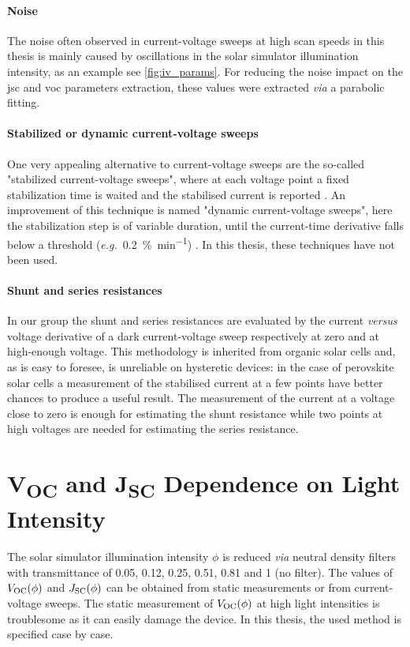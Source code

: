 	\paragraph{Noise} The noise often observed in current-voltage sweeps at high scan speeds in this thesis is mainly caused by oscillations in the solar simulator illumination intensity, as an example see \cref{fig:iv_params}.
	For reducing the noise impact on the \gls{jsc} and \gls{voc} parameters extraction, these values were extracted \textit{via} a parabolic fitting.

	\paragraph{Stabilized or dynamic current-voltage sweeps} One very appealing alternative to current-voltage sweeps are the so-called "stabilized current-voltage sweeps", where at each voltage point a fixed stabilization time is waited and the stabilised current is reported \cite{Unger2014, Christoforo2015}.
	An improvement of this technique is named "dynamic current-voltage sweeps", here the stabilization step is of variable duration, until the current-time derivative falls below a threshold (\textit{e.g.}\ \SI{0.2}{\%\per\minute}) \cite{Dunbar2017,Dunbar2017a}.
	In this thesis, these techniques have not been used.

	\paragraph{Shunt and series resistances} \label{resistances} In our group the shunt and series resistances are evaluated by the current \textit{versus} voltage derivative of a dark current-voltage sweep respectively at zero and at high-enough voltage.
	This methodology is inherited from organic solar cells and, as is easy to foresee, is unreliable on hysteretic devices: in the case of perovskite solar cells a measurement of the stabilised current at a few points have better chances to produce a useful result.
	The measurement of the current at a voltage close to zero is enough for estimating the shunt resistance while two points at high voltages are needed for estimating the series resistance.

\section{V\textsubscript{OC} and J\textsubscript{SC} Dependence on Light Intensity}
	The solar simulator illumination intensity $\phi$ is reduced \textit{via} neutral density filters with transmittance of 0.05, 0.12, 0.25, 0.51, 0.81 and 1 (no filter).
	The values of $V_\mathrm{OC}(\phi)$ and $J_\mathrm{SC}(\phi)$ can be obtained from static measurements or from current-voltage sweeps.
	The static measurement of $V_\mathrm{OC}(\phi)$ at high light intensities is troublesome as it can easily damage the device.
	In this thesis, the used method is specified case by case.

